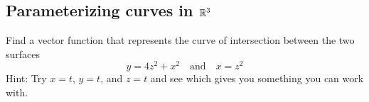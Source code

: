 \documentclass[12pt]{exam}
\begin{document}
\begin{questions}

\newpage

\subsection*{Parameterizing curves in \(\mathbb{R}^3\)}

\question Find a vector function that represents the curve of intersection between the two surfaces 
\[
    y=4z^2+x^2 \quad\text{and}\quad x=z^2
\]
Hint: Try \(x=t\), \(y=t\), and \(z=t\) and see which gives you something you can work with.
    \ifprintanswers
            \begin{solution}

            \end{solution}
        \else
            \vfill
        \fi
\end{questions}
\end{document}

